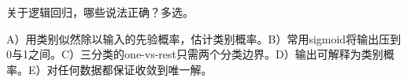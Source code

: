 关于逻辑回归，哪些说法正确？多选。


A）用类别似然除以输入的先验概率，估计类别概率。B）常用sigmoid将输出压到0与1之间。C）三分类的one-vs-rest只需两个分类边界。D）输出可解释为类别概率。E）对任何数据都保证收敛到唯一解。
